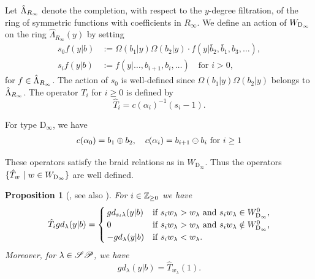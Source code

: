 \documentclass[a4paper]{amsart}
\newtheorem{prop}[thm]{Proposition}
\theoremstyle{remark}
\numberwithin{equation}{section}
\begin{document}
Let $\hat{\Lambda}_{R_\infty}$ denote the completion, with respect
to the $y$-degree filtration, of the ring of symmetric functions
with coefficients in $R_\infty$.
We define an action of $W_{\mathrm{D}_\infty}$ on the ring $\widehat{\Lambda}_{R_\infty}({y})$ by setting
\begin{align}
s_0 f(y| b) &:= \Omega(b_1| y)\Omega(b_2| y) \cdot f(y | \bar{b}_2, \bar{b}_1, b_3, \ldots),  \\
s_i f(y| b) &:= f(y | \ldots, b_{i+1}, b_i, \ldots) \quad \text{for } i > 0,
\end{align}
for $f\in\hat{\Lambda}_{R_\infty}$.
The action of $s_0$ is well-defined since
$\Omega(b_1|y)\Omega(b_2|y)$ belongs to $\hat{\Lambda}_{R_\infty}$.
The operator $T_i$ for $i\geq 0$ is defined by
\begin{equation}\label{eq_T_inf}
\hat{T}_i={c(\alpha_i)}^{-1}(s_i-1).
\end{equation}






For type $\mathrm{D}_\infty$, we have
\begin{align*}
    c(\alpha_0)= b_1 \oplus b_2, \quad
    c(\alpha_i) = b_{i+1} \ominus b_i \text{ for $ i\ge 1$}
\end{align*}



These operators satisfy the braid relations as in $W_{\mathrm{D}_\infty}$.
Thus the operators $\{\hat{T}_w~|~w\in W_{\mathrm{D}_\infty}\}$ are well defined. 

\begin{prop}[\cite{NN:Uni}, see also \cite{ISY2}]\label{prop_T_i}
For $i\in \mathbb{Z}_{\ge 0}$ we have
\[
\hat{T}_i gd_\lambda(y| b)=
\begin{cases}
gd_{s_i \lambda}(y| b)
& \text{if $s_i w_\lambda>w_\lambda$ and $s_i w_\lambda\in W_{\mathrm{D}_\infty}^0$,}\\
0
& \text{if $s_i w_\lambda>w_\lambda$ and $s_i w_\lambda\notin W_{\mathrm{D}_\infty}^0$,}\\
- gd_{\lambda}(y| b)
& \text{if $s_i w_\lambda<w_\lambda$.}
\end{cases}
\]
Moreover, for $\lambda\in\mathscr{SP}$, we have
 $$gd_{\lambda}(y| b)=\hat{T}_{w_\lambda}(1).$$
\end{prop}
\end{document}

